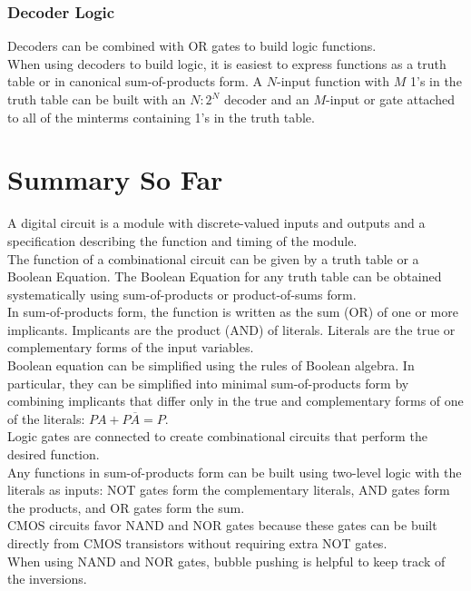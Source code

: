 \documentclass[12pt]{article}
\theoremstyle{definition}
\begin{document}
  \subsubsection{Decoder Logic}
  Decoders can be combined with OR gates to build logic functions. \\
  When using decoders to build logic, it is easiest to express functions as a truth table or in canonical sum-of-products form.
  A $N$-input function with $M$ 1's in the truth table can be built with an $N:2^{N}$ decoder and an $M$-input or gate attached to all of the minterms containing 1's in the truth table.

  \newpage
  \section{Summary So Far}
  A digital circuit is a module with discrete-valued inputs and outputs and a specification describing the function and timing of the module. \\

  The function of a combinational circuit can be given by a truth table or a Boolean Equation. The Boolean Equation for any truth table can be obtained systematically using sum-of-products or product-of-sums form. \\
  In sum-of-products form, the function is written as the sum (OR) of one or more implicants.
  Implicants are the product (AND) of literals.
  Literals are the true or complementary forms of the input variables.  \\

  Boolean equation can be simplified using the rules of Boolean algebra.
  In particular, they can be simplified into minimal sum-of-products form by combining implicants that differ only in the true and complementary forms of one of the literals: $PA + P\overline{A} = P$. \\

  Logic gates are connected to create combinational circuits that perform the desired function. \\
  Any functions in sum-of-products form can be built using two-level logic with the literals as inputs: NOT gates form the complementary literals, AND gates form the products, and OR gates form the sum. \\
  CMOS circuits favor NAND and NOR gates because these gates can be built directly from CMOS transistors without requiring extra NOT gates. \\
  When using NAND and NOR gates, bubble pushing is helpful to keep track of the inversions. \\
\end{document}
